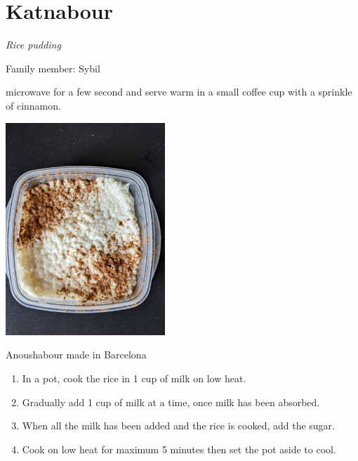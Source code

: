 \chapter{Katnabour}
\label{ch:katnabour}


\textit{Rice pudding}

Family member: Sybil

 microwave for a few second and serve warm in a small coffee cup with a sprinkle of cinnamon.

\begin{marginfigure}
  \includegraphics[width=60mm]{dermardiros/images/Rice pudding.jpg}
  \caption{Anoushabour made in Barcelona}
\end{marginfigure}


\begin{enumerate}
    \item In a pot, cook the rice in 1 cup of milk on low heat.
    \item Gradually add 1 cup of milk at a time, once milk has been absorbed.
    \item When all the milk has been added and the rice is cooked, add the sugar. 
    \item Cook on low heat for maximum 5 minutes then set the pot aside to cool.
\end{enumerate}
